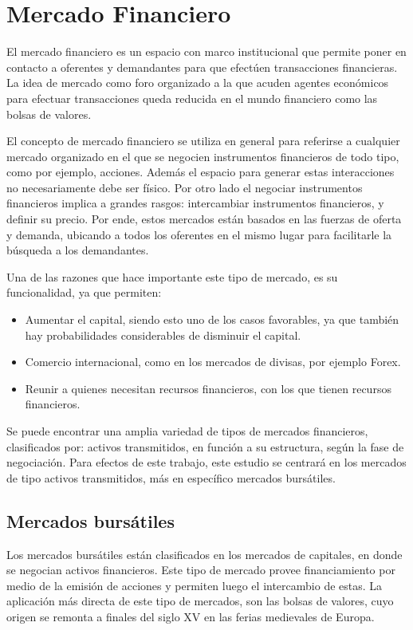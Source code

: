 \section{Mercado Financiero}
El mercado financiero es un espacio con marco institucional que permite poner en contacto a oferentes y demandantes para que efectúen 
transacciones financieras. La idea de mercado como foro organizado a la que acuden agentes económicos para efectuar transacciones
queda reducida en el mundo financiero como las bolsas de valores.

El concepto de mercado financiero se utiliza en general para referirse a cualquier mercado organizado en el que se negocien instrumentos financieros
de todo tipo, como por ejemplo, acciones. Además el espacio para generar estas interacciones no necesariamente debe ser físico. Por otro lado el negociar
instrumentos financieros implica a grandes rasgos: intercambiar instrumentos financieros, y definir su precio. Por ende, estos mercados están basados en 
las fuerzas de oferta y demanda, ubicando a todos los oferentes en el mismo lugar para facilitarle la búsqueda a los demandantes.

Una de las razones que hace importante este tipo de mercado, es su funcionalidad, ya que permiten:
\begin{itemize}
	\item Aumentar el capital, siendo esto uno de los casos favorables, ya que también hay probabilidades considerables de disminuir el capital.
	\item Comercio internacional, como en los mercados de divisas, por ejemplo Forex.
	\item Reunir a quienes necesitan recursos financieros, con los que tienen recursos financieros.
\end{itemize}

Se puede encontrar una amplia variedad de tipos de mercados financieros, clasificados por: activos transmitidos, en función a su estructura, según la fase de 
negociación. Para efectos de este trabajo, este estudio se centrará en los mercados de tipo activos transmitidos, más en específico mercados bursátiles.

\subsection{Mercados bursátiles}
Los mercados bursátiles están clasificados en los mercados de capitales, en donde se negocian activos financieros. Este tipo de mercado provee financiamiento
por medio de la emisión de acciones y permiten luego el intercambio de estas. La aplicación más directa de este tipo de mercados, son las bolsas de valores, cuyo
origen se remonta a finales del siglo XV en las ferias medievales de Europa.

